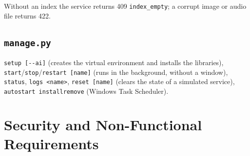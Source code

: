 Without an index the service returns 409 \texttt{index\_\allowbreak{}empty}; a
corrupt image or audio file returns 422.

\hypertarget{manage.py}{%
\subsection{\texorpdfstring{\texttt{manage.\allowbreak{}py}}{manage.py}}\label{manage.py}}

\texttt{setup {[}-\/\allowbreak{}-ai{]}} (creates the virtual environment and
installs the libraries),
\texttt{start}/\texttt{stop}/\texttt{restart {[}name{]}} (runs in the
background, without a window), \texttt{status},
\texttt{logs \textless{}name\textgreater{}\allowbreak{}}, \texttt{reset {[}name{]}}
(clears the state of a simulated service),
\texttt{autostart install\textbar{}remove} (Windows Task Scheduler).

\hypertarget{security-and-non-functional-requirements}{%
\section{Security and Non-Functional
Requirements}\label{security-and-non-functional-requirements}}


